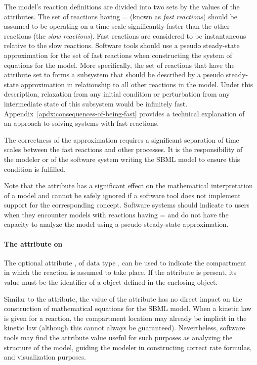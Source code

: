 The model's reaction definitions are divided into two sets by the
values of the  attributes.  The set of reactions
having = (known as \emph{fast reactions})
should be assumed to be operating on a time scale significantly
faster than the other reactions (the \emph{slow reactions}).  Fast
reactions are considered to be instantaneous relative to the slow
reactions.  Software tools should use a pseudo steady-state
approximation for the set of fast reactions when constructing the
system of equations for the model.  More specifically, the set of
reactions that have the  attribute set to 
forms a subsystem that should be described by a pseudo
steady-state approximation in relationship to all other reactions
in the model.  Under this description, relaxation from any initial
condition or perturbation from any intermediate state of this
subsystem would be infinitely fast.
Appendix~\ref{apdx:consequences-of-being-fast} provides a
technical explanation of an approach to solving systems with fast
reactions.

The correctness of the approximation requires a significant
separation of time scales between the fast reactions and other
processes.  It is the responsibility of the modeler or of the
software system writing the SBML model to ensure this condition is
fulfilled.

Note that the  attribute has a significant effect on
the mathematical interpretation of a model and cannot be safely
ignored if a software tool does not implement support for the
corresponding concept.  Software systems should indicate to users
when they encounter models with reactions having
= and do not have the capacity to analyze
the model using a pseudo steady-state approximation.


\paragraph{The  attribute on }
\label{sec:reaction-compartment}

The optional attribute , of data type
, can be used to indicate the compartment in
which the reaction is assumed to take place.  If the attribute is
present, its value must be the identifier of a \Compartment object
defined in the enclosing \Model object.

Similar to the  attribute, the value of the
 attribute has no direct impact on the
construction of mathematical equations for the SBML model.  When a
kinetic law is given for a reaction, the compartment location may
already be implicit in the kinetic law (although this cannot
always be guaranteed).  Nevertheless, software tools may find the
 attribute value useful for such purposes as
analyzing the structure of the model, guiding the modeler in
constructing correct rate formulas, and visualization purposes.


